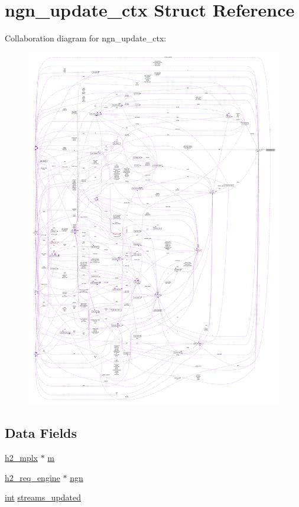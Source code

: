 \hypertarget{structngn__update__ctx}{}\section{ngn\+\_\+update\+\_\+ctx Struct Reference}
\label{structngn__update__ctx}


Collaboration diagram for ngn\+\_\+update\+\_\+ctx\+:
\nopagebreak
\begin{figure}[H]
\begin{center}
\leavevmode
\includegraphics[width=350pt]{structngn__update__ctx__coll__graph}
\end{center}
\end{figure}
\subsection*{Data Fields}
\begin{DoxyCompactItemize}
\item 
\hyperlink{structh2__mplx}{h2\+\_\+mplx} $\ast$ \hyperlink{structngn__update__ctx_a1783579b7dde81ab42def42abd3fbbd1}{m}
\item 
\hyperlink{structh2__req__engine}{h2\+\_\+req\+\_\+engine} $\ast$ \hyperlink{structngn__update__ctx_a2bd6ee9f94b233ecdb05dc9d08911fee}{ngn}
\item 
\hyperlink{pcre_8txt_a42dfa4ff673c82d8efe7144098fbc198}{int} \hyperlink{structngn__update__ctx_ae3420629f06b39e59db049b08d6d6e58}{streams\+\_\+updated}
\end{DoxyCompactItemize}


